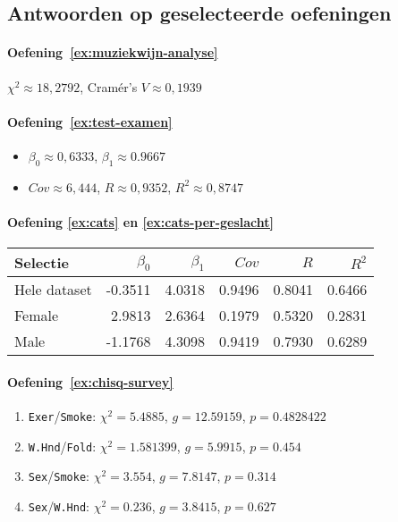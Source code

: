 \subsection{Antwoorden op geselecteerde oefeningen}
\label{ssec:analyse-2-variabelen-oplossingen}

\paragraph{Oefening~\ref{ex:muziekwijn-analyse}}

$\chi^2 \approx 18,2792$, Cramér's $V \approx 0,1939$

\paragraph{Oefening~\ref{ex:test-examen}}

\begin{itemize}
  \item $\beta_{0} \approx 0,6333$, $\beta_{1} \approx 0.9667$
  \item $Cov \approx 6,444$, $R \approx 0,9352$, $R^2 \approx 0,8747$
\end{itemize}

\paragraph{Oefening \ref{ex:cats} en \ref{ex:cats-per-geslacht}}

\begin{center}
  \begin{tabular}{lrrrrr}
  	\toprule
    \textbf{Selectie} & \textbf{$\beta_{0}$} & \textbf{$\beta_{1}$} & \textbf{$Cov$} & \textbf{$R$} & \textbf{$R^2$} \\
    \midrule
  	Hele dataset & -0.3511 & 4.0318 & 0.9496 & 0.8041 & 0.6466 \\
  	Female       &  2.9813 & 2.6364 & 0.1979 & 0.5320 & 0.2831 \\
  	Male         & -1.1768 & 4.3098 & 0.9419 & 0.7930 & 0.6289 \\
    \bottomrule
  \end{tabular}
\end{center}


\paragraph{Oefening~\ref{ex:chisq-survey}}

\begin{enumerate}
  \item \texttt{Exer}/\texttt{Smoke}: $\chi^2 = 5.4885$, $g = 12.59159$, $p = 0.4828422$
  \item \texttt{W.Hnd}/\texttt{Fold}: $\chi^2 = 1.581399$, $g = 5.9915$, $p = 0.454$
  \item \texttt{Sex}/\texttt{Smoke}: $\chi^2 = 3.554$, $g = 7.8147$, $p = 0.314$
  \item \texttt{Sex}/\texttt{W.Hnd}: $\chi^2 = 0.236$, $g = 3.8415$, $p = 0.627$
\end{enumerate}


